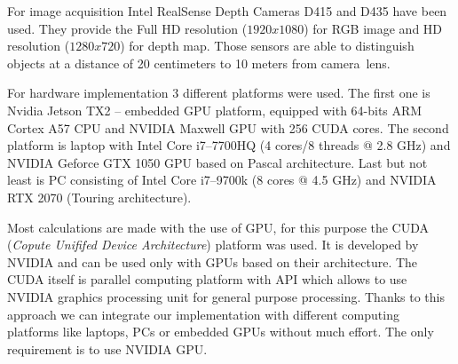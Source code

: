 \documentclass[b5paper,10pt,twoside]{article}
\begin{document}
{For image acquisition Intel RealSense Depth Cameras D415 and D435 have been used. They provide the Full HD resolution ($1920x1080$) for RGB image and HD resolution ($1280x720$) for depth map. Those sensors are able to distinguish objects at a distance of 20 centimeters to 10 meters from camera~lens.



For hardware implementation 3 different platforms were used. The first one is Nvidia Jetson TX2 -- embedded GPU platform, equipped with 64-bits ARM Cortex A57 CPU and NVIDIA Maxwell GPU with 256 CUDA cores. The second platform is laptop with Intel Core i7--7700HQ (4 cores/8 threads @ 2.8 GHz) and NVIDIA Geforce GTX 1050 GPU based on Pascal architecture. Last but not least is PC consisting of Intel Core i7--9700k (8 cores @ 4.5 GHz) and NVIDIA RTX 2070 (Touring architecture).


Most calculations are made with the use of GPU, for this purpose the CUDA (\textit{Copute Unififed Device Architecture}) platform was used. It is developed by NVIDIA and can be used only with GPUs based on their architecture. The CUDA itself is parallel computing platform with API which allows to use NVIDIA graphics processing unit for general purpose processing. Thanks to this approach we can integrate our implementation with different computing platforms like laptops, PCs or embedded GPUs without much effort. The only requirement is to use NVIDIA GPU. 


}
\end{document}
